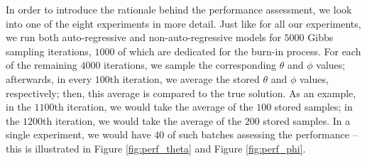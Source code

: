 \documentclass{mpaper}
\begin{document}
\par In order to introduce the rationale behind the performance assessment, we look into one of the eight experiments in more detail. Just like for all our experiments, we run both auto-regressive and non-auto-regressive models for $5000$ Gibbs sampling iterations, $1000$ of which are dedicated for the burn-in process. For each of the remaining $4000$ iterations, we sample the corresponding $\theta$ and $\phi$ values; afterwards, in every $100$th iteration, we average the stored $\theta$ and $\phi$ values, respectively; then, this average is compared to the true solution. As an example, in the $1100$th iteration, we would take the average of the $100$ stored samples; in the $1200$th iteration, we would take the average of the $200$ stored samples. In a single experiment, we would have $40$ of such batches assessing the performance -- this is illustrated in Figure \ref{fig:perf_theta} and Figure \ref{fig:perf_phi}.
\end{document}
